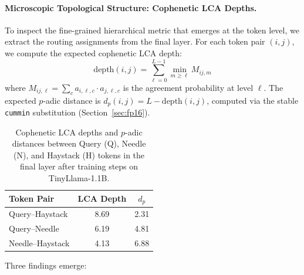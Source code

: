 \documentclass[11pt,a4paper]{article}
\begin{document}
\paragraph{Microscopic Topological Structure: Cophenetic LCA Depths.}
To inspect the fine-grained hierarchical metric that emerges at the token level, we extract the routing assignments from the final layer. For each token pair $(i, j)$, we compute the expected cophenetic LCA depth:
\begin{equation}
    \text{depth}(i, j) = \sum_{\ell=0}^{L-1} \min_{m \geq \ell} M_{ij,m}
\end{equation}
where $M_{ij,\ell} = \sum_c a_{i,\ell,c} \cdot a_{j,\ell,c}$ is the agreement probability at level $\ell$. The expected $p$-adic distance is $d_p(i,j) = L - \text{depth}(i,j)$, computed via the stable \texttt{cummin} substitution (Section~\ref{sec:fp16}).

\begin{table}[h]
\centering
\caption{Cophenetic LCA depths and $p$-adic distances between Query (Q), Needle (N), and Haystack (H) tokens in the final layer after training steps on TinyLlama-1.1B.}
\label{tab:niah}
\begin{tabular}{@{}lcc@{}}
\toprule
Token Pair & LCA Depth & $d_p$ \\
\midrule
Query--Haystack  & 8.69 & 2.31 \\
Query--Needle    & 6.19 & 4.81 \\
Needle--Haystack & 4.13 & 6.88 \\
\bottomrule
\end{tabular}
\end{table}

Three findings emerge:
\end{document}
